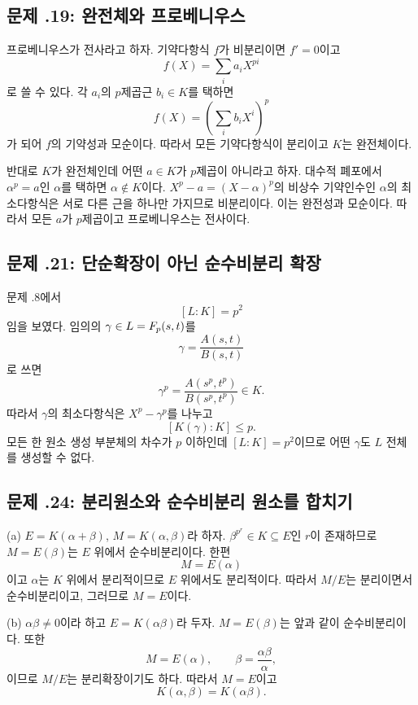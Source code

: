 \subsection*{문제 \thechapter.19: 완전체와 프로베니우스}

\begin{solution}
프로베니우스가 전사라고 하자. 기약다항식 $f$가 비분리이면 $f'=0$이고
\[
  f(X)=\sum_i a_iX^{pi}
\]
로 쓸 수 있다. 각 $a_i$의 $p$제곱근 $b_i\in K$를 택하면
\[
  f(X)=\left(\sum_i b_iX^i\right)^p
\]
가 되어 $f$의 기약성과 모순이다. 따라서 모든 기약다항식이 분리이고 $K$는 완전체이다.

반대로 $K$가 완전체인데 어떤 $a\in K$가 $p$제곱이 아니라고 하자. 대수적 폐포에서 $\alpha^p=a$인 $\alpha$를 택하면 $\alpha\notin K$이다. $X^p-a=(X-\alpha)^p$의 비상수 기약인수인 $\alpha$의 최소다항식은 서로 다른 근을 하나만 가지므로 비분리이다. 이는 완전성과 모순이다. 따라서 모든 $a$가 $p$제곱이고 프로베니우스는 전사이다.
\end{solution}

\subsection*{문제 \thechapter.21: 단순확장이 아닌 순수비분리 확장}

\begin{solution}
문제 \thechapter.8에서
\[
  [L:K]=p^2
\]
임을 보였다. 임의의 $\gamma\in L=F_p(s,t)$를
\[
  \gamma=\frac{A(s,t)}{B(s,t)}
\]
로 쓰면
\[
  \gamma^p
  =\frac{A(s^p,t^p)}{B(s^p,t^p)}\in K.
\]
따라서 $\gamma$의 최소다항식은 $X^p-\gamma^p$를 나누고
\[
  [K(\gamma):K]\le p.
\]
모든 한 원소 생성 부분체의 차수가 $p$ 이하인데 $[L:K]=p^2$이므로 어떤 $\gamma$도 $L$ 전체를 생성할 수 없다.
\end{solution}

\subsection*{문제 \thechapter.24: 분리원소와 순수비분리 원소를 합치기}

\begin{solution}
(a) $E=K(\alpha+\beta)$, $M=K(\alpha,\beta)$라 하자. $\beta^{p^r}\in K\subseteq E$인 $r$이 존재하므로 $M=E(\beta)$는 $E$ 위에서 순수비분리이다. 한편
\[
  M=E(\alpha)
\]
이고 $\alpha$는 $K$ 위에서 분리적이므로 $E$ 위에서도 분리적이다. 따라서 $M/E$는 분리이면서 순수비분리이고, 그러므로 $M=E$이다.

(b) $\alpha\beta\ne0$이라 하고 $E=K(\alpha\beta)$라 두자. $M=E(\beta)$는 앞과 같이 순수비분리이다. 또한
\[
  M=E(\alpha),
  \qquad
  \beta=\frac{\alpha\beta}{\alpha},
\]
이므로 $M/E$는 분리확장이기도 하다. 따라서 $M=E$이고
\[
  K(\alpha,\beta)=K(\alpha\beta).
\]
\end{solution}

